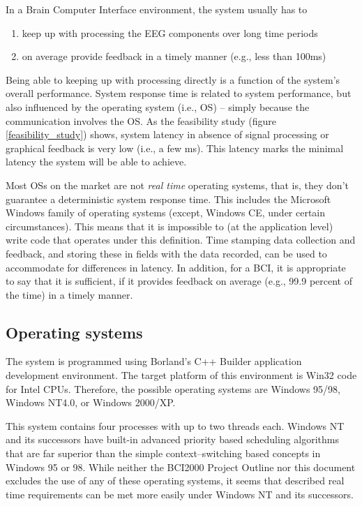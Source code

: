 In a Brain Computer Interface environment, the system usually has to 
\begin{enumerate}
 \item{keep up with processing the EEG components over long time periods}
 \item{on average provide feedback in a timely manner (e.g., less than 100ms)}
\end{enumerate}

Being able to keeping up with processing directly is a function of the system's 
overall performance. System response time is related to system performance, 
but also influenced by the operating system (i.e., OS) -- simply because the 
communication involves the OS. As the feasibility study (figure 
\ref{feasibility_study}) shows, system latency in absence of signal processing 
or graphical feedback is very low (i.e., a few ms). This latency marks the 
minimal latency the system will be able to achieve.

Most OSs on the market are not \textit{real time} operating systems, that is, 
they don't guarantee a deterministic system response time. This includes the 
Microsoft Windows family of operating systems (except, Windows CE, under certain 
circumstances). This means that it is impossible to (at the application level) 
write code that operates under this definition. Time stamping data collection 
and feedback, and storing these in fields with the data recorded, can be used to 
accommodate for differences in latency. In addition, for a BCI, it is appropriate 
to say that it is sufficient, if it provides feedback on average (e.g., 99.9 
percent of the time) in a timely manner. 


\subsection{Operating systems}

The system is programmed using Borland's C++ Builder application development 
environment. The target platform of this environment is Win32 code for Intel 
CPUs. Therefore, the possible operating systems are Windows 95/98, Windows 
NT4.0, or Windows 2000/XP.

This system contains four processes with up to two threads each. Windows NT 
and its successors have built-in advanced priority based scheduling algorithms 
that are far superior than the simple context--switching based concepts in 
Windows 95 or 98. While neither the BCI2000 Project Outline nor this document 
excludes the use of any of these operating systems, it seems that described real 
time requirements can be met more easily under Windows NT and its successors.


